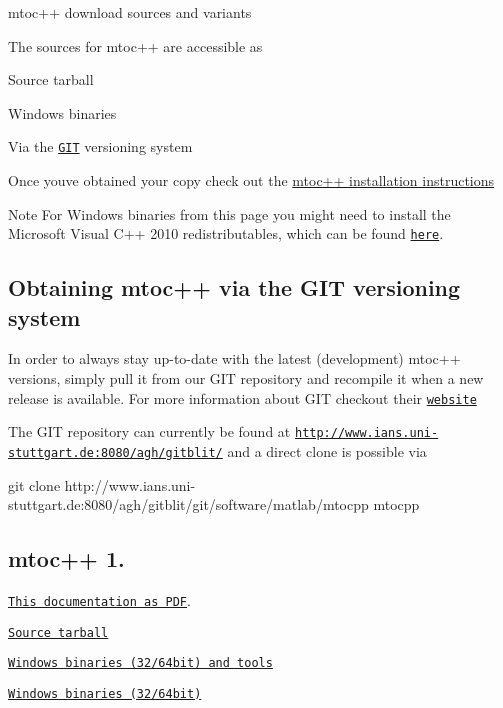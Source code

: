 mtoc++ download sources and variants

The sources for mtoc++ are accessible as
\begin{DoxyItemize}
\item Source tarball
\item Windows binaries
\item Via the \href{http://git-scm.com/}{\tt G\+I\+T} versioning system
\end{DoxyItemize}

Once you\textquotesingle{}ve obtained your copy check out the \hyperlink{install}{mtoc++ installation instructions}

\begin{DoxyNote}{Note}
For Windows binaries from this page you might need to install the Microsoft Visual C++ 2010 redistributables, which can be found \href{http://www.microsoft.com/download/en/confirmation.aspx?id=8328}{\tt here}.
\end{DoxyNote}
\hypertarget{download_git}{}\subsection{Obtaining mtoc++ via the G\+I\+T versioning system}\label{download_git}
In order to always stay up-\/to-\/date with the latest (development) mtoc++ versions, simply pull it from our G\+I\+T repository and recompile it when a new release is available. For more information about G\+I\+T checkout their \href{http://git-scm.com/}{\tt website}

The G\+I\+T repository can currently be found at \href{http://www.ians.uni-stuttgart.de:8080/agh/gitblit/}{\tt http\+://www.\+ians.\+uni-\/stuttgart.\+de\+:8080/agh/gitblit/} and a direct clone is possible via 
\begin{DoxyCode}
git clone http:\textcolor{comment}{//www.ians.uni-stuttgart.de:8080/agh/gitblit/git/software/matlab/mtocpp mtocpp }
\end{DoxyCode}
\hypertarget{download_mtocrelease}{}\subsection{mtoc++ 1.}\label{download_mtocrelease}

\begin{DoxyItemize}
\item \href{http://www.morepas.org/software/mtocpp/docs/manual.pdf}{\tt This documentation as P\+D\+F}.
\item \href{http://www.morepas.org/software/mtocpp/mtoc++_src_1.5.tar.gz}{\tt Source tarball}
\item \href{http://www.morepas.org/software/mtocpp/mtoc++_win_1.5.zip}{\tt Windows binaries (32/64bit) and tools}
\item \href{http://www.morepas.org/software/mtocpp/mtoc++_win_binaries_1.5.zip}{\tt Windows binaries (32/64bit)} 
\end{DoxyItemize}
